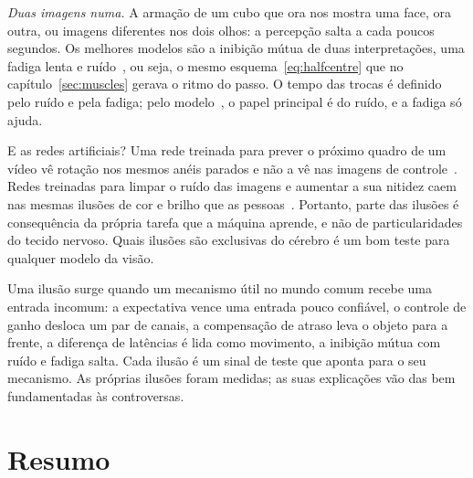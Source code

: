 \emph{Duas imagens numa.} A armação de um cubo que ora nos mostra uma face, ora outra, ou imagens diferentes nos dois olhos: a percepção salta a cada poucos segundos. Os melhores modelos são a inibição mútua de duas interpretações, uma fadiga lenta e ruído~\cite{MorenoBote2007}, ou seja, o mesmo esquema~\eqref{eq:halfcentre} que no capítulo~\ref{sec:muscles} gerava o ritmo do passo. O tempo das trocas é definido pelo ruído e pela fadiga; pelo modelo~\cite{MorenoBote2007}, o papel principal é do ruído, e a fadiga só ajuda.

E as redes artificiais? Uma rede treinada para prever o próximo quadro de um vídeo vê rotação nos mesmos anéis parados e não a vê nas imagens de controle~\cite{Watanabe2018}. Redes treinadas para limpar o ruído das imagens e aumentar a sua nitidez caem nas mesmas ilusões de cor e brilho que as pessoas~\cite{GomezVilla2020}. Portanto, parte das ilusões é consequência da própria tarefa que a máquina aprende, e não de particularidades do tecido nervoso. Quais ilusões são exclusivas do cérebro é um bom teste para qualquer modelo da visão.

\begin{keyblock}
\begin{proposition}
\label{prop:illusions}
Uma ilusão surge quando um mecanismo útil no mundo comum recebe uma entrada incomum: a expectativa vence uma entrada pouco confiável, o controle de ganho desloca um par de canais, a compensação de atraso leva o objeto para a frente, a diferença de latências é lida como movimento, a inibição mútua com ruído e fadiga salta. Cada ilusão é um sinal de teste que aponta para o seu mecanismo. As próprias ilusões foram medidas; as suas explicações vão das bem fundamentadas às controversas.
\end{proposition}
\end{keyblock}

\section{Resumo}

